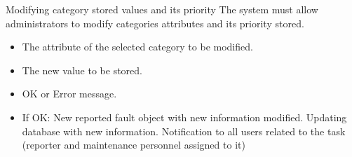 \begin{requirement}{Modifying category stored values and its priority}
\reqdesc The system must allow administrators to modify categories attributes and its priority stored.
\reqin 
\begin{itemize}
\item The attribute of the selected category to be modified.
\item The new value to be stored.
\end{itemize}

\reqout \begin{itemize}
	\item OK or Error message.
	\item If OK:
	\subitem New reported fault object with new information modified.
	\subitem Updating database with new information.
	\subitem Notification to all users related to the task (reporter and maintenance personnel assigned to it)
\end{itemize}
\end{requirement}





